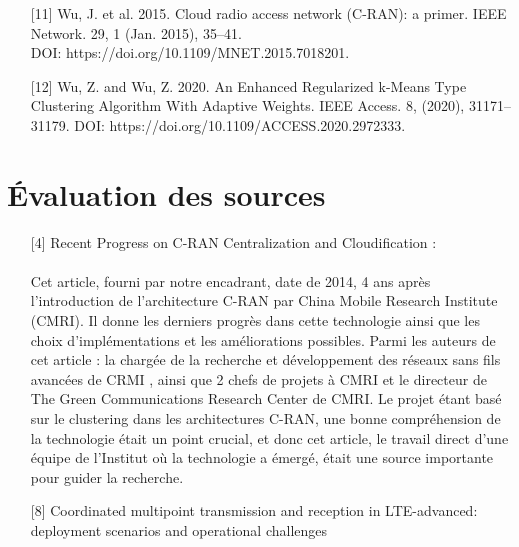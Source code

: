 \documentclass{article}
\begin{document}
\begin{enumerate}
\item[{[11]}] Wu, J. et al. 2015. Cloud radio access network (C-RAN): a primer. IEEE Network. 29, 1 (Jan. 2015), 35–41.\\DOI: https://doi.org/10.1109/MNET.2015.7018201.
\item[{[12]}] Wu, Z. and Wu, Z. 2020. An Enhanced Regularized k-Means Type Clustering Algorithm With Adaptive Weights. IEEE Access. 8, (2020), 31171–31179. DOI: https://doi.org/10.1109/ACCESS.2020.2972333.
\end{enumerate}
\section{Évaluation des sources}
\begin{itemize}
  \item [{[4]}] Recent Progress on C-RAN Centralization and Cloudification :
  \paragraph{}

  Cet article, fourni par notre encadrant, date de 2014, 4 ans après l'introduction 
  de l'architecture C-RAN par China Mobile Research Institute (CMRI). Il donne les 
  derniers progrès dans cette technologie ainsi que les choix d’implémentations et 
  les améliorations possibles. Parmi les auteurs de cet article : la chargée de la 
  recherche et développement des réseaux sans fils avancées de CRMI , ainsi que 2 chefs 
  de projets à CMRI et le directeur de The Green Communications Research Center de CMRI. 
  Le projet étant basé sur le clustering dans les architectures C-RAN, une bonne compréhension 
  de la technologie était un point crucial, et donc cet article, le travail direct d’une équipe 
  de l'Institut où la technologie a émergé, était une source importante pour guider la recherche.
  
  \item [{[8]}] Coordinated multipoint transmission and reception in LTE-advanced: deployment scenarios and operational challenges

\end{itemize}
\end{document}

